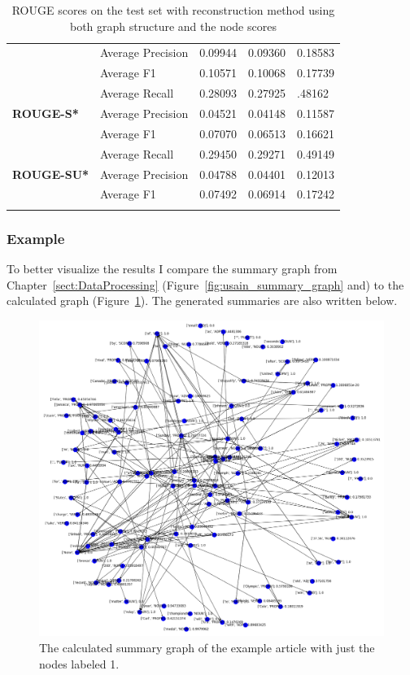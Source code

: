 \begin{longtable}{| l | l | l | l | l |}
		&Average Precision&0.09944&0.09360&0.18583 \\
		&Average F1&0.10571&0.10068&0.17739 \\ \hline \hline
	\multirow{3}{*}{\textbf{ROUGE-S*}}
		&Average Recall&0.28093&0.27925&.48162 \\
		&Average Precision&0.04521&0.04148&0.11587 \\
		&Average F1&0.07070&0.06513&0.16621 \\ \hline \hline
	\multirow{3}{*}{\textbf{ROUGE-SU*}}
		&Average Recall&0.29450&0.29271&0.49149 \\
		&Average Precision&0.04788&0.04401&0.12013 \\
		&Average F1&0.07492&0.06914&0.17242 \\ \hline
	\caption{ROUGE scores on the test set with reconstruction method using both graph structure and the node scores}
\end{longtable}

\subsubsection{Example}
To better visualize the results I compare the summary graph from Chapter~\ref{sect:DataProcessing} (Figure~\ref{fig:usain_summary_graph} and) to the calculated graph (Figure~\ref{fig:usain_bolt_predicted0}). The generated summaries are also written below.

\begin{figure}[!ht]
	\centering
	\includegraphics[width=150mm, keepaspectratio]{figures/usain_bolt_predicted.png}
	\caption{The calculated summary graph of the example article with just the nodes labeled 1.}
	\label{fig:usain_bolt_predicted0}
\end{figure}

